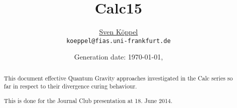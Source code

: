 \documentclass[10pt,a4paper, fleqn]{article}
\title{\vspace{-9ex} Calc15 \vspace{-1ex}} %
\author{\small %
\href{https://itp.uni-frankfurt.de/~koeppel}{Sven Köppel} \\
\small \texttt{koeppel@fias.uni-frankfurt.de}}
\date{\small Generation date: \today, \currenttime}
\begin{document}
\maketitle

\renewcommand{\d}{\mathrm{d}}
\newcommand{\dd}[2]{\frac{\mathrm{d} #1}{\mathrm{d} #2}}
\newcommand{\pp}[2]{\frac{\partial #1}{\partial #2}}
\renewcommand{\L}{L_P}
\newcommand{\pr}{p_r}
\newcommand{\psenk}{p_\perp}
\newcommand{\ebenso}{\biggl( ~ \therefore ~ \biggr) }
\newcommand{\metrik}[1]{\d s^2 = \left( #1 \right) \d t^2 \left( #1 \right)^{-1} \d r^2 + r^2 \d \Omega_{D-2}^2 }
\newcommand{\winkel}{r^2 \d \Omega^2}
\newcommand{\dann}{$\rightarrow~$}
\newcommand{\CA}{ {\cal A}}
\newcommand{\C}[1]{ {\cal #1}}
\newcommand{\mn}{_{\mu\nu}}

\newcommand*{\mathcolor}{}
\def\mathcolor#1#{\mathcoloraux{#1}}
\newcommand*{\mathcoloraux}[3]{%
  \protect\leavevmode
  \begingroup
    \color#1{#2}#3%
  \endgroup
}
\newcommand{\redmin}{\mathcolor{red}{-}}
\newcommand{\redplus}{\mathcolor{red}{+}}
\newcommand{\pn}{\mathcolor{OliveGreen}{+ n}}
\newcommand{\n}{ {\mathcolor{OliveGreen}{n}} }

\begin{multicols}{2}
\begin{abstract}
This document effective Quantum Gravity approaches
investigated in the Calc series so far in respect
to their divergence curing behaviour.

This is done for the Journal Club presentation at
18. June 2014.
\end{abstract}
\vfill
\columnbreak
\tableofcontents
\end{multicols}
\end{document}
